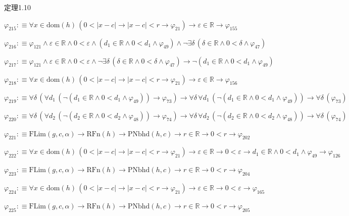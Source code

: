 \begin{fullproof}{定理1.10}
\begin{abbrevlist}
\item $\varphi_{215} :\equiv \forall x \in \mathrm{dom}(h)\,(0 < \lvert x - c \rvert \to \lvert x - c \rvert < r \to \varphi_{21}) \to \varepsilon \in \mathbb{R} \to \varphi_{155}$
\item $\varphi_{216} :\equiv \varphi_{121} \land \varepsilon \in \mathbb{R} \land 0 < \varepsilon \land (d_{1} \in \mathbb{R} \land 0 < d_{1} \land \varphi_{49}) \land \neg \exists \delta\,(\delta \in \mathbb{R} \land 0 < \delta \land \varphi_{47})$
\item $\varphi_{217} :\equiv \varphi_{121} \land \varepsilon \in \mathbb{R} \land 0 < \varepsilon \land \neg \exists \delta\,(\delta \in \mathbb{R} \land 0 < \delta \land \varphi_{47}) \to \neg (d_{1} \in \mathbb{R} \land 0 < d_{1} \land \varphi_{49})$
\item $\varphi_{218} :\equiv \forall x \in \mathrm{dom}(h)\,(0 < \lvert x - c \rvert \to \lvert x - c \rvert < r \to \varphi_{21}) \to \varepsilon \in \mathbb{R} \to \varphi_{156}$
\item $\varphi_{219} :\equiv \forall \delta\,(\forall d_{1}\,(\neg (d_{1} \in \mathbb{R} \land 0 < d_{1} \land \varphi_{49})) \to \varphi_{73}) \to \forall \delta\,\forall d_{1}\,(\neg (d_{1} \in \mathbb{R} \land 0 < d_{1} \land \varphi_{49})) \to \forall \delta\,(\varphi_{73})$
\item $\varphi_{220} :\equiv \forall \delta\,(\forall d_{2}\,(\neg (d_{2} \in \mathbb{R} \land 0 < d_{2} \land \varphi_{48})) \to \varphi_{74}) \to \forall \delta\,\forall d_{2}\,(\neg (d_{2} \in \mathbb{R} \land 0 < d_{2} \land \varphi_{48})) \to \forall \delta\,(\varphi_{74})$
\item $\varphi_{221} :\equiv \mathrm{FLim}(g,c,\alpha) \to \mathrm{RFn}(h) \to \mathrm{PNbhd}(h,c) \to r \in \mathbb{R} \to 0 < r \to \varphi_{202}$
\item $\varphi_{222} :\equiv \forall x \in \mathrm{dom}(h)\,(0 < \lvert x - c \rvert \to \lvert x - c \rvert < r \to \varphi_{21}) \to \varepsilon \in \mathbb{R} \to 0 < \varepsilon \to d_{1} \in \mathbb{R} \land 0 < d_{1} \land \varphi_{49} \to \varphi_{126}$
\item $\varphi_{223} :\equiv \mathrm{FLim}(g,c,\alpha) \to \mathrm{RFn}(h) \to \mathrm{PNbhd}(h,c) \to r \in \mathbb{R} \to 0 < r \to \varphi_{204}$
\item $\varphi_{224} :\equiv \forall x \in \mathrm{dom}(h)\,(0 < \lvert x - c \rvert \to \lvert x - c \rvert < r \to \varphi_{21}) \to \varepsilon \in \mathbb{R} \to 0 < \varepsilon \to \varphi_{165}$
\item $\varphi_{225} :\equiv \mathrm{FLim}(g,c,\alpha) \to \mathrm{RFn}(h) \to \mathrm{PNbhd}(h,c) \to r \in \mathbb{R} \to 0 < r \to \varphi_{205}$

\end{abbrevlist}
\end{fullproof}
